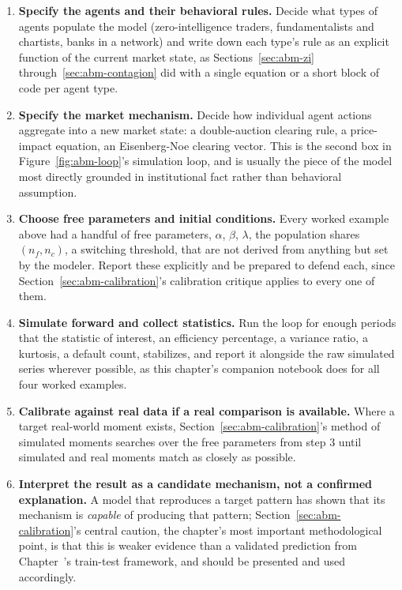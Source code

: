 \documentclass[../ai_in_finance]{subfiles}
\begin{document}
\begin{enumerate}
    \item \textbf{Specify the agents and their behavioral rules.} Decide what types of agents populate the model (zero-intelligence traders, fundamentalists and chartists, banks in a network) and write down each type's rule as an explicit function of the current market state, as Sections~\ref{sec:abm-zi} through~\ref{sec:abm-contagion} did with a single equation or a short block of code per agent type.
    \item \textbf{Specify the market mechanism.} Decide how individual agent actions aggregate into a new market state: a double-auction clearing rule, a price-impact equation, an Eisenberg-Noe clearing vector. This is the second box in Figure~\ref{fig:abm-loop}'s simulation loop, and is usually the piece of the model most directly grounded in institutional fact rather than behavioral assumption.
    \item \textbf{Choose free parameters and initial conditions.} Every worked example above had a handful of free parameters, $\alpha$, $\beta$, $\lambda$, the population shares $(n_f,n_c)$, a switching threshold, that are not derived from anything but set by the modeler. Report these explicitly and be prepared to defend each, since Section~\ref{sec:abm-calibration}'s calibration critique applies to every one of them.
    \item \textbf{Simulate forward and collect statistics.} Run the loop for enough periods that the statistic of interest, an efficiency percentage, a variance ratio, a kurtosis, a default count, stabilizes, and report it alongside the raw simulated series wherever possible, as this chapter's companion notebook does for all four worked examples.
    \item \textbf{Calibrate against real data if a real comparison is available.} Where a target real-world moment exists, Section~\ref{sec:abm-calibration}'s method of simulated moments searches over the free parameters from step 3 until simulated and real moments match as closely as possible.
    \item \textbf{Interpret the result as a candidate mechanism, not a confirmed explanation.} A model that reproduces a target pattern has shown that its mechanism is \emph{capable} of producing that pattern; Section~\ref{sec:abm-calibration}'s central caution, the chapter's most important methodological point, is that this is weaker evidence than a validated prediction from Chapter~'s train-test framework, and should be presented and used accordingly.
\end{enumerate}
\end{document}
